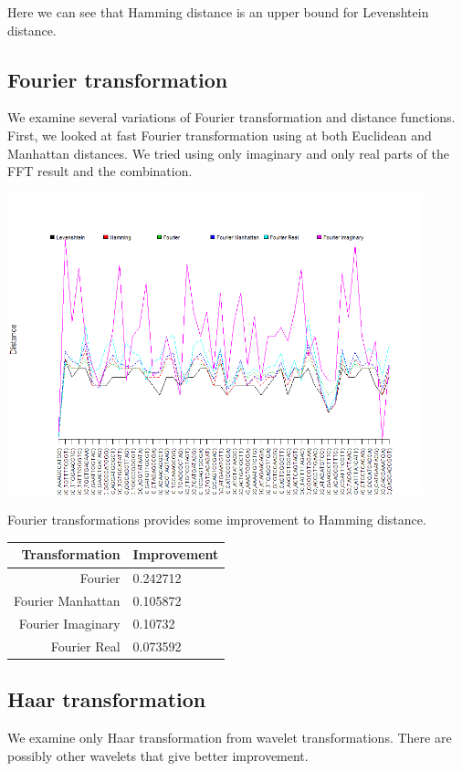 \documentclass [12pt, a4]{article} %
\begin{document}
Here we can see that Hamming distance is an upper bound for Levenshtein distance.

\subsection{Fourier transformation}

We examine several variations of Fourier transformation and distance functions. First, we looked at fast Fourier transformation using at both Euclidean and Manhattan distances. We tried using only imaginary and only real parts of the FFT result and the combination.

\includegraphics[width=0.9\textwidth]{img/fourier.png}

Fourier transformations provides some improvement to Hamming distance.

\begin{table}[H]
\begin{tabular}{ r | l }
    Transformation & Improvement \\ \hline
    Fourier           & 0.242712 \\
    Fourier Manhattan & 0.105872 \\
    Fourier Imaginary & 0.10732 \\
    Fourier Real      & 0.073592 \\
\end{tabular}
\end{table}

\subsection{Haar transformation}

We examine only Haar transformation from wavelet transformations. There are possibly other wavelets that give better improvement.
\end{document}
